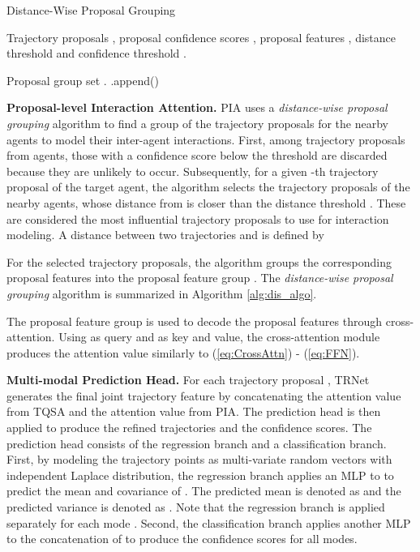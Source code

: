 \documentclass[10pt,twocolumn,letterpaper]{article}
\begin{document}
\begin{algorithm}[t]
\caption{Distance-Wise Proposal Grouping} \label{alg:dis_algo}
\begin{algorithmic}[1]
\renewcommand{\algorithmicrequire}{\textbf{Input:}}
\renewcommand{\algorithmicensure}{\textbf{Output:}}
\REQUIRE Trajectory proposals , proposal confidence scores ,  proposal features , distance threshold  and confidence threshold . 

\ENSURE  Proposal group set .
\IF{}
\STATE 
\vspace{0.4em}
\IF{}
\STATE  .append()
\ENDIF
\ENDIF
\ENDFOR
\ENDFOR
\STATE
\RETURN 
\end{algorithmic}
\end{algorithm}

\noindent\textbf{Proposal-level Interaction Attention.} PIA uses a {\it distance-wise proposal grouping} algorithm to find a group of the trajectory proposals for the nearby agents to model their inter-agent interactions. First, among  trajectory proposals from  agents, those with a confidence score below the threshold  are discarded because they are unlikely to occur. Subsequently, for a given -th trajectory proposal  of the target agent, the algorithm selects the trajectory proposals of the nearby agents, whose distance from  is closer than the distance threshold . These are considered the most influential trajectory proposals to use for interaction modeling. A distance between two trajectories  and  is defined by 

For the selected trajectory proposals, the algorithm groups the corresponding proposal features into the proposal feature group .
 The {\it distance-wise proposal grouping} algorithm is summarized in Algorithm \ref{alg:dis_algo}. 
 
 The proposal feature group is used to decode the proposal features  through cross-attention.
 Using  as query and  as key and value, the cross-attention module produces the attention value  similarly to (\ref{eq:CrossAttn}) - (\ref{eq:FFN}).

\noindent\textbf{Multi-modal Prediction Head.} For each trajectory proposal , TRNet generates the final joint trajectory feature   by concatenating the attention value  from TQSA and the attention value  from PIA. The prediction head is then applied to produce the refined trajectories and the confidence scores. The prediction head consists of the regression branch and a classification branch. First, by modeling the trajectory points as multi-variate random vectors with independent Laplace distribution, the regression branch applies an MLP to  to predict the mean and covariance of .
 The predicted mean is denoted as
 and the predicted variance is denoted as 
. Note that the regression branch is applied separately for each mode .
  Second, the classification branch applies another MLP to the concatenation of  to produce the confidence scores  for all modes.
\end{document}
